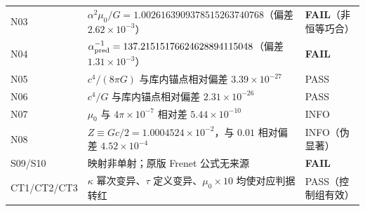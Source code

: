 \documentclass[UTF8,fontset=fandol,11pt]{ctexart}
\begin{document}
\begin{center}
\begin{tabular}{p{1.6cm}p{9.2cm}p{3.4cm}}
N03 & $\alpha^2\mu_0/G=1.0026163909378515263740768$（偏差 $2.62\times10^{-3}$） & \textbf{FAIL}（非恒等巧合） \\
N04 & $\alpha^{-1}_{\rm pred}=137.21515176624628894115048$（偏差 $1.31\times10^{-3}$） & \textbf{FAIL} \\
N05 & $c^4/(8\pi G)$ 与库内锚点相对偏差 $3.39\times10^{-27}$ & PASS \\
N06 & $c^4/G$ 与库内锚点相对偏差 $2.31\times10^{-26}$ & PASS \\
N07 & $\mu_0$ 与 $4\pi\times10^{-7}$ 相对差 $5.44\times10^{-10}$ & INFO \\
N08 & $Z\equiv Gc/2=1.0004524\times10^{-2}$，与 $0.01$ 相对偏差 $4.52\times10^{-4}$ & INFO（伪显著） \\
S09/S10 & 映射非单射；原版 Frenet 公式无来源 & \textbf{FAIL} \\
CT1/CT2/CT3 & $\kappa$ 幂次变异、$\tau$ 定义变异、$\mu_0\times10$ 均使对应判据转红 & PASS（控制组有效） \\
\bottomrule
\end{tabular}
\end{center}
\end{document}
